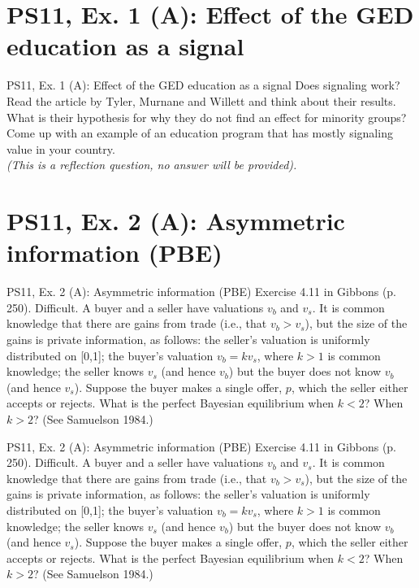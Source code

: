\section{PS11, Ex. 1 (A): Effect of the GED education as a signal}

\begin{frame}{PS11, Ex. 1 (A): Effect of the GED education as a signal}
    Does signaling work? Read the article by Tyler, Murnane and Willett and think about
    their results. What is their hypothesis for why they do not find an effect for minority groups? Come up with an example of an education program that has mostly signaling value in your country.\\\medskip
    \textit{(This is a reflection question, no answer will be provided).}
    \vfill\null
\end{frame}



\section{PS11, Ex. 2 (A): Asymmetric information (PBE)}

\begin{frame}{PS11, Ex. 2 (A): Asymmetric information (PBE)}
    Exercise 4.11 in Gibbons (p. 250). Difficult. A buyer and a seller have valuations $v_b$ and $v_s$. It is common knowledge that there are gains from trade (i.e., that $v_b > v_s$), but the size of the gains is private information, as follows: the seller’s valuation is uniformly distributed on [0,1]; the buyer’s valuation $v_b = kv_s$, where $k > 1$ is common knowledge; the seller knows $v_s$ (and hence $v_b$) but the buyer does not know $v_b$ (and hence $v_s$). Suppose the buyer makes a single offer, $p$, which the seller either accepts or rejects. What is the perfect Bayesian equilibrium when $k < 2$? When $k > 2$? (See Samuelson 1984.)
    \vfill\null
\end{frame}

\begin{frame}{PS11, Ex. 2 (A): Asymmetric information (PBE)}
    Exercise 4.11 in Gibbons (p. 250). Difficult. A buyer and a seller have valuations $v_b$ and $v_s$. It is common knowledge that there are gains from trade (i.e., that $v_b > v_s$), but the size of the gains is private information, as follows: the seller’s valuation is uniformly distributed on [0,1]; the buyer’s valuation $v_b = kv_s$, where $k > 1$ is common knowledge; the seller knows $v_s$ (and hence $v_b$) but the buyer does not know $v_b$ (and hence $v_s$). Suppose the buyer makes a single offer, $p$, which the seller either accepts or rejects. What is the perfect Bayesian equilibrium when $k < 2$? When $k > 2$? (See Samuelson 1984.) \vspace{-8pt}
    \begin{multicols}{2}
      \vfill\null\columnbreak
      \vfill\null
    \end{multicols}
\end{frame}
